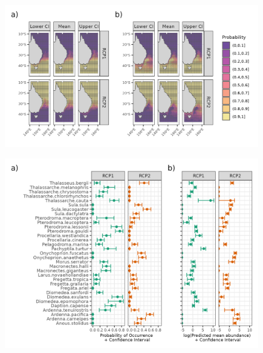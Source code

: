 \documentclass{article}
\begin{document}
\begin{landscape}

\begin{figure}

{\centering \includegraphics[width=1.1\linewidth]{../results/Fig3_probability-maps-spring} 

}

\caption{ }\label{fig:fig4-prob-maps}
\end{figure}

\newpage

\begin{figure}

{\centering \includegraphics[width=1\linewidth]{../results/Fig5_spp-profiles-spring} 

}

\caption{ }\label{fig:fig5-spp-profiles}
\end{figure}

\end{landscape}



\end{document}
